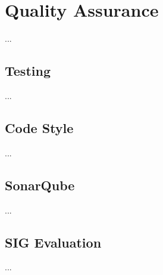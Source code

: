 \chapter{Quality Assurance} \label{cha:qa}
	...

	\section{Testing} \label{sec:testing}
		...
		
	\section{Code Style} \label{sec:codestyle}
		...
		
	\section{SonarQube} \label{sec:sonarqube}
		...
		
	\section{SIG Evaluation} \label{sec:sigevaluation}
		...
